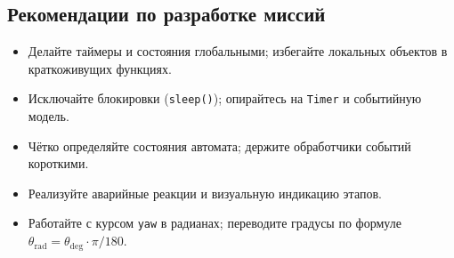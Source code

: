 \subsection{Рекомендации по разработке миссий}
\begin{itemize}
  \item Делайте таймеры и состояния глобальными; избегайте локальных объектов в краткоживущих функциях.
  \item Исключайте блокировки (\texttt{sleep()}); опирайтесь на \texttt{Timer} и событийную модель.
  \item Чётко определяйте состояния автомата; держите обработчики событий короткими.
  \item Реализуйте аварийные реакции и визуальную индикацию этапов.
  \item Работайте с курсом \texttt{yaw} в радианах; переводите градусы по формуле \(\theta_{\mathrm{rad}}=\theta_{\mathrm{deg}}\cdot\pi/180\).
\end{itemize}
